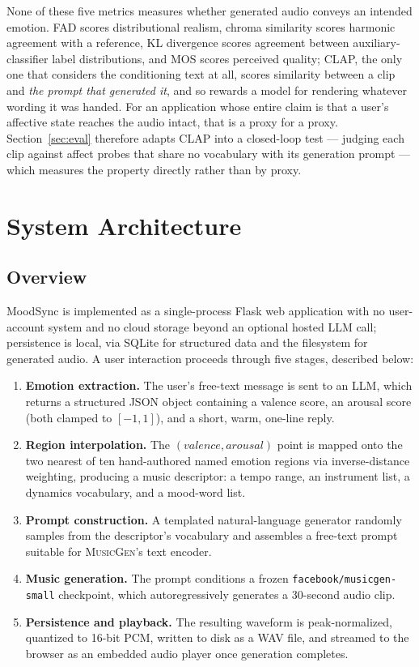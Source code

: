 \documentclass[11pt]{article}
\newcommand{\musicgen}{\textsc{MusicGen}}
\begin{document}
None of these five metrics measures whether generated audio conveys an intended emotion. FAD scores distributional realism, chroma similarity scores harmonic agreement with a reference, KL divergence scores agreement between auxiliary-classifier label distributions, and MOS scores perceived quality; CLAP, the only one that considers the conditioning text at all, scores similarity between a clip and \emph{the prompt that generated it}, and so rewards a model for rendering whatever wording it was handed. For an application whose entire claim is that a user's affective state reaches the audio intact, that is a proxy for a proxy. Section~\ref{sec:eval} therefore adapts CLAP into a closed-loop test --- judging each clip against affect probes that share no vocabulary with its generation prompt --- which measures the property directly rather than by proxy.

\section{System Architecture}

\subsection{Overview}

MoodSync is implemented as a single-process Flask web application with no user-account system and no cloud storage beyond an optional hosted LLM call; persistence is local, via SQLite for structured data and the filesystem for generated audio. A user interaction proceeds through five stages, described below:

\begin{enumerate}[leftmargin=*]
    \item \textbf{Emotion extraction.} The user's free-text message is sent to an LLM, which returns a structured JSON object containing a valence score, an arousal score (both clamped to $[-1,1]$), and a short, warm, one-line reply.
    \item \textbf{Region interpolation.} The $(valence, arousal)$ point is mapped onto the two nearest of ten hand-authored named emotion regions via inverse-distance weighting, producing a music descriptor: a tempo range, an instrument list, a dynamics vocabulary, and a mood-word list.
    \item \textbf{Prompt construction.} A templated natural-language generator randomly samples from the descriptor's vocabulary and assembles a free-text prompt suitable for \musicgen{}'s text encoder.
    \item \textbf{Music generation.} The prompt conditions a frozen \texttt{facebook/musicgen-small} checkpoint, which autoregressively generates a 30-second audio clip.
    \item \textbf{Persistence and playback.} The resulting waveform is peak-normalized, quantized to 16-bit PCM, written to disk as a WAV file, and streamed to the browser as an embedded audio player once generation completes.
\end{enumerate}
\end{document}

